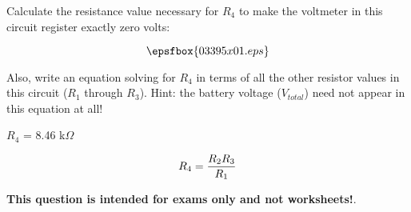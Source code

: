 

Calculate the resistance value necessary for $R_4$ to make the voltmeter in this circuit register exactly zero volts:

$$\epsfbox{03395x01.eps}$$

Also, write an equation solving for $R_4$ in terms of all the other resistor values in this circuit ($R_1$ through $R_3$).  Hint: the battery voltage ($V_{total}$) need not appear in this equation at all!







$R_4$ = 8.46 k$\Omega$

$$R_4 = {{R_2 R_3} \over R_1}$$







{\bf This question is intended for exams only and not worksheets!}.



